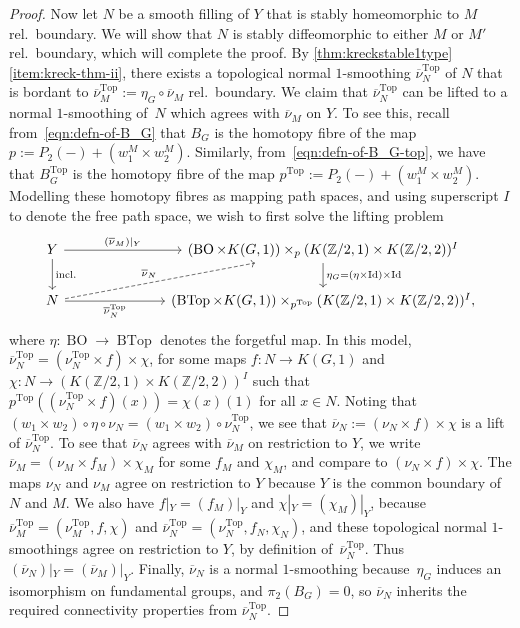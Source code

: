 \documentclass[a4paper, reqno]{amsart}
\theoremstyle{definition}
\theoremstyle{remark}
\renewcommand{\top}{\mathrm{Top}}
\newcommand{\Z}{\mathbb{Z}}
\newcommand{\Id}{\operatorname{Id}}
\newcommand{\ol}{\overline}
\DeclareMathOperator{\BTop}{BTop}
\DeclareMathOperator{\BO}{BO}
\begin{document}
\begin{proof}
Now let $N$ be a smooth filling of $Y$ that is stably homeomorphic to $M$ rel.\ boundary. We will show that $N$ is stably diffeomorphic to either $M$ or $M'$ rel.\ boundary, which will complete the proof. By \cref{thm:kreckstable1type}\,\eqref{item:kreck-thm-ii}, there exists a topological normal $1$-smoothing $\ol{\nu}_N^{\top}$ of $N$ that is bordant to $\overline{\nu}^{\top}_M:=\eta_G\circ \ol{\nu}_M$ rel.\ boundary.
We claim that $\ol{\nu}_N^{\top}$ can be lifted to a normal $1$-smoothing of~$N$ which agrees with $\ol{\nu}_M$ on $Y$. To see this, recall from~\eqref{eqn:defn-of-B_G} that $B_G$ is the homotopy fibre of the map $p:=P_2(-)+(w_1^M\times w_2^M)$. Similarly, from~\eqref{eqn:defn-of-B_G-top}, we have that $B_G^{\top}$ is the homotopy fibre of the map $p^{\top}:=P_2(-)+(w_1^M\times w_2^M)$. Modelling these homotopy fibres as mapping path spaces, and using superscript $I$ to denote the free path space, we wish to first solve the lifting problem
\[
\begin{tikzcd}
    Y\ar[rrr, "(\overline{\nu}_M)|_Y"]\ar[d, "\mathrm{incl.}"]
    &&&
    (\BO\times K(G,1))\times_p(K(\Z/2,1)\times K(\Z/2,2))^I\ar[d, "\eta_G=(\eta\times\Id)\times \Id"]
    \\
     N\ar[rrr, "\overline{\nu}^{\top}_N"']\ar[urrr, dashed,"\ol{\nu}_N"]
     &&&
    (\BTop\times K(G,1))\times_{p^{\top}}(K(\Z/2,1)\times K(\Z/2,2))^I,
\end{tikzcd}
\]
where $\eta\colon \BO\to\BTop$ denotes the forgetful map.
In this model, $\overline{\nu}^{\top}_N=(\nu^{\top}_N\times f)\times\chi$, for some maps $f\colon N\to K(G,1)$ and $\chi\colon N\to (K(\Z/2,1)\times K(\Z/2,2))^I$ such that $p^{\top}((\nu_N^{\top}\times f)(x))=\chi(x)(1)$ for all $x\in N$. Noting that $(w_1\times w_2)\circ\eta\circ\nu_N=(w_1\times w_2)\circ\nu^{\top}_N$, we see that $\overline{\nu}_N:=(\nu_N\times f)\times\chi$ is a lift of $\overline{\nu}_N^{\top}$. 
To see that $\ol{\nu}_N$ agrees with $\ol{\nu}_M$ on restriction to $Y$, we write 
$\overline{\nu}_M=(\nu_M\times f_M)\times\chi_M$ for some $f_M$ and $\chi_M$, and compare to $(\nu_N\times f)\times\chi$. The maps $\nu_N$ and $\nu_M$ agree on restriction to $Y$ because $Y$ is the common boundary of $N$ and $M$. We also have $f|_Y=(f_M)|_Y$ and $\chi|_Y=(\chi_M)|_Y$, because $\ol{\nu}_M^{\top}=(\nu_M^{\top},f,\chi)$ and  $\ol{\nu}_N^{\top}=(\nu_N^{\top},f_N,\chi_N)$, and these topological normal $1$-smoothings agree on restriction to $Y$, by definition of~$\overline{\nu}^{\top}_N$. Thus $(\ol{\nu}_N)|_Y=(\ol{\nu}_M)|_Y$.
Finally, $\ol{\nu}_N$ is a normal $1$-smoothing because~$\eta_G$ induces an isomorphism on fundamental groups, and $\pi_2(B_G)=0$, so $\ol{\nu}_N$ inherits the required connectivity 
 properties from $\overline{\nu}_N^{\top}$. 



\end{proof}
\end{document}
